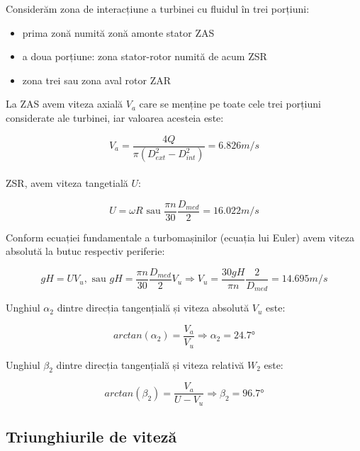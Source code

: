 Considerăm zona de interacțiune a turbinei cu fluidul în trei porțiuni:
\begin{itemize}
	\item prima zonă numită zonă amonte stator ZAS
	\item a doua porțiune: zona stator-rotor numită de acum ZSR
	\item zona trei sau zona aval rotor ZAR
\end{itemize}

La ZAS avem viteza axială $V_{a}$ care se menține pe toate cele trei porțiuni considerate ale turbinei, iar valoarea acesteia este:

\begin{equation}
V_a=\frac{4Q}{\pi(D_{ext}^2-D_{int}^2)}=6.826\si{m/s}
\end{equation}\\

\In ZSR, avem viteza tangetială $U$:

\begin{equation}
U=\omega R \text{ sau } \frac{\pi n}{30} \frac{D_{med}}{2}=16.022\si{m/s}
\end{equation}

Conform ecuației fundamentale a turbomașinilor (ecuația lui Euler) avem viteza absolută la butuc respectiv periferie:

\begin{equation}
gH=UV_{u}, \text{ sau } gH=\frac{\pi n}{30} \frac{D_{med}}{2} V_{u} \Rightarrow V_{u}=\frac{30gH}{\pi n} \frac{2}{D_{med}}=14.695\si{m/s}
\end{equation}


Unghiul $\alpha_2$ dintre direcția tangențială și viteza absolută $V_u$ este:

\begin{equation}
arctan(\alpha_{2 })=\frac{V_{a}}{V_{u}} \Rightarrow \alpha_{2}=24.7\si{\degree}
\end{equation}



Unghiul $\beta_2$ dintre direcția tangențială și viteza relativă $W_2$ este:

\begin{equation}
arctan(\beta_{2})=\frac{V_{a}}{U - V_{u}} \Rightarrow \beta_{2} =96.7\si{\degree}
\end{equation}


\subsection{Triunghiurile de viteză}

